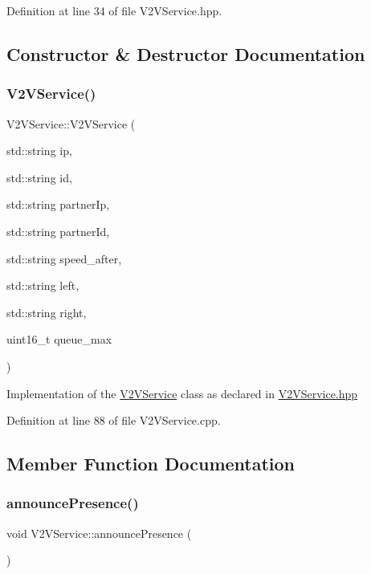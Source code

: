 Definition at line 34 of file V2\+V\+Service.\+hpp.



\subsection{Constructor \& Destructor Documentation}
\mbox{\label{class_v2_v_service_a26d77b5b1e8f2d11a51d3dc6ca9751bb}} 
\subsubsection{\texorpdfstring{V2\+V\+Service()}{V2VService()}}
{\footnotesize\ttfamily V2\+V\+Service\+::\+V2\+V\+Service (\begin{DoxyParamCaption}\item[{std\+::string}]{ip,  }\item[{std\+::string}]{id,  }\item[{std\+::string}]{partner\+Ip,  }\item[{std\+::string}]{partner\+Id,  }\item[{std\+::string}]{speed\+\_\+after,  }\item[{std\+::string}]{left,  }\item[{std\+::string}]{right,  }\item[{uint16\+\_\+t}]{queue\+\_\+max }\end{DoxyParamCaption})}

Implementation of the \mbox{\hyperlink{class_v2_v_service}{V2\+V\+Service}} class as declared in \mbox{\hyperlink{_v2_v_service_8hpp_source}{V2\+V\+Service.\+hpp}} 

Definition at line 88 of file V2\+V\+Service.\+cpp.



\subsection{Member Function Documentation}
\mbox{\label{class_v2_v_service_a1e2f575ac83bebcda2c557d425b3050f}} 
\subsubsection{\texorpdfstring{announce\+Presence()}{announcePresence()}}
{\footnotesize\ttfamily void V2\+V\+Service\+::announce\+Presence (\begin{DoxyParamCaption}{ }\end{DoxyParamCaption})}

